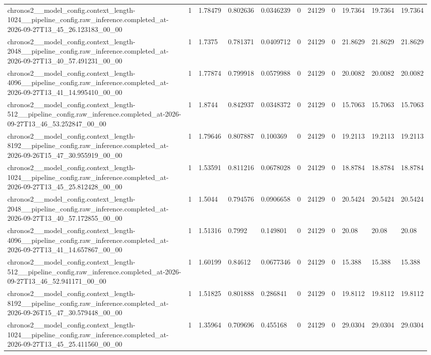 \begin{tabular}{lllllllllll}
chronos2\_\_model\_config.context\_length-1024\_\_pipeline\_config.raw\_inference.completed\_at-2026-09-27T13\_45\_26.123183\_00\_00 & 1 & 1.78479 & 0.802636 & 0.0346239 & 0 & 24129 & 0 & 19.7364 & 19.7364 & 19.7364 \\
chronos2\_\_model\_config.context\_length-2048\_\_pipeline\_config.raw\_inference.completed\_at-2026-09-27T13\_40\_57.491231\_00\_00 & 1 & 1.7375 & 0.781371 & 0.0409712 & 0 & 24129 & 0 & 21.8629 & 21.8629 & 21.8629 \\
chronos2\_\_model\_config.context\_length-4096\_\_pipeline\_config.raw\_inference.completed\_at-2026-09-27T13\_41\_14.995410\_00\_00 & 1 & 1.77874 & 0.799918 & 0.0579988 & 0 & 24129 & 0 & 20.0082 & 20.0082 & 20.0082 \\
chronos2\_\_model\_config.context\_length-512\_\_pipeline\_config.raw\_inference.completed\_at-2026-09-27T13\_46\_53.252847\_00\_00 & 1 & 1.8744 & 0.842937 & 0.0348372 & 0 & 24129 & 0 & 15.7063 & 15.7063 & 15.7063 \\
chronos2\_\_model\_config.context\_length-8192\_\_pipeline\_config.raw\_inference.completed\_at-2026-09-26T15\_47\_30.955919\_00\_00 & 1 & 1.79646 & 0.807887 & 0.100369 & 0 & 24129 & 0 & 19.2113 & 19.2113 & 19.2113 \\
chronos2\_\_model\_config.context\_length-1024\_\_pipeline\_config.raw\_inference.completed\_at-2026-09-27T13\_45\_25.812428\_00\_00 & 1 & 1.53591 & 0.811216 & 0.0678028 & 0 & 24129 & 0 & 18.8784 & 18.8784 & 18.8784 \\
chronos2\_\_model\_config.context\_length-2048\_\_pipeline\_config.raw\_inference.completed\_at-2026-09-27T13\_40\_57.172855\_00\_00 & 1 & 1.5044 & 0.794576 & 0.0906658 & 0 & 24129 & 0 & 20.5424 & 20.5424 & 20.5424 \\
chronos2\_\_model\_config.context\_length-4096\_\_pipeline\_config.raw\_inference.completed\_at-2026-09-27T13\_41\_14.657867\_00\_00 & 1 & 1.51316 & 0.7992 & 0.149801 & 0 & 24129 & 0 & 20.08 & 20.08 & 20.08 \\
chronos2\_\_model\_config.context\_length-512\_\_pipeline\_config.raw\_inference.completed\_at-2026-09-27T13\_46\_52.941171\_00\_00 & 1 & 1.60199 & 0.84612 & 0.0677346 & 0 & 24129 & 0 & 15.388 & 15.388 & 15.388 \\
chronos2\_\_model\_config.context\_length-8192\_\_pipeline\_config.raw\_inference.completed\_at-2026-09-26T15\_47\_30.579448\_00\_00 & 1 & 1.51825 & 0.801888 & 0.286841 & 0 & 24129 & 0 & 19.8112 & 19.8112 & 19.8112 \\
chronos2\_\_model\_config.context\_length-1024\_\_pipeline\_config.raw\_inference.completed\_at-2026-09-27T13\_45\_25.411560\_00\_00 & 1 & 1.35964 & 0.709696 & 0.455168 & 0 & 24129 & 0 & 29.0304 & 29.0304 & 29.0304 \\

\end{tabular}
